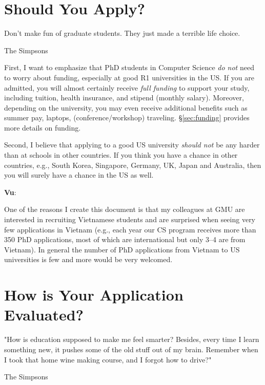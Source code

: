 \documentclass[11pt]{article}
\newenvironment{commentbox}[1][]{
\small
    \begin{cbox}
    \textbf{#1}: 
 }{
   \end{cbox}
}
\begin{document}
\section{Should You Apply?}
\epigraph{\vspace{-0.2in} Don't make fun of graduate students. They just made a terrible life choice.}{The Simpsons}

First, I want to emphasize that PhD students in Computer Science \emph{do not} need to worry about funding, especially at good R1
universities in the US. If you are admitted, you will almost certainly
receive \emph{full funding} to support your study, including tuition,
health insurance, and stipend (monthly salary). Moreover, depending on the university,
you may even receive additional benefits such as summer pay, laptops, (conference/workshop) traveling. \S\ref{sec:funding} provides more details on funding.

Second, I believe that applying to a good US university \emph{should not} be any
harder than at schools in other countries. If you think you have a chance in other countries, e.g., South Korea, Singapore, Germany, UK, Japan and Australia, then you will surely have a chance in the US as well.

\begin{commentbox}[Vu]
One of the reasons I create this document is that my colleagues at GMU are interested in recruiting Vietnamese students and are surprised when seeing very few applications in Vietnam (e.g., each year our CS program receives more than 350 PhD applications, most of which are international but only 3--4 are from Vietnam). In general the number of
PhD applications from Vietnam to US universities is few and  more would be very welcomed. 
\end{commentbox}



\section{How is Your Application Evaluated?}

\epigraph{"How is education supposed to make me feel smarter? Besides, every time I learn something new, it pushes some of the old stuff out of my brain. Remember when I took that home wine making course, and I forgot how to drive?"}{The Simpsons}
\end{document}
